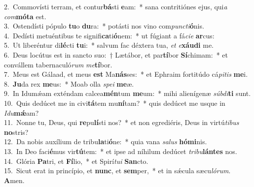 {2.~}Commovísti terram, et contur\textbf{bá}sti \textbf{e}am:~* sana contritiónes ejus, qui\textit{a} \textit{com}\textbf{mó}\textbf{ta} est.\\
{3.~}Ostendísti pópulo \textbf{tu}o \textbf{du}ra:~* potásti nos vino com\textit{pun}\textit{cti}\textbf{ó}nis.\\
{4.~}Dedísti metuéntibus te signifi\textbf{ca}ti\textbf{ó}nem:~* ut fúgiant a fá\textit{ci}\textit{e} \textbf{ar}cus:\\
{5.~}Ut liberéntur di\textbf{lé}cti \textbf{tu}i:~* salvum fac déxtera tua, \textit{et} \textit{e}\textbf{xáu}\textbf{di} me.\\
{6.~}Deus locútus est in sancto suo:~† Lætábor, et par\textbf{tí}bor \textbf{Sí}chimam:~* et convállem tabernaculó\textit{rum} \textit{me}\textbf{tí}bor.\\
{7.~}Meus est Gálaad, et meus \textbf{est} Ma\textbf{nás}ses:~* et Ephraim fortitúdo cá\textit{pi}\textit{tis} \textbf{me}i.\\
{8.~}\textbf{Ju}da rex \textbf{me}us:~* Moab olla \textit{spe}\textit{i} \textbf{me}æ.\\
{9.~}In Idumǽam exténdam calcea\textbf{mén}tum \textbf{me}um:~* mihi alienígenæ \textit{súb}\textit{di}\textbf{ti} sunt.\\
{10.~}Quis dedúcet me in civi\textbf{tá}tem mu\textbf{ní}tam?~* quis dedúcet me usque in \textit{I}\textit{du}\textbf{mǽ}am?\\
{11.~}Nonne tu, Deus, qui \textbf{re}pu\textbf{lí}sti nos?~* et non egrediéris, Deus in virtú\textit{ti}\textit{bus} \textbf{no}stris?\\
{12.~}Da nobis auxílium de tribu\textbf{la}ti\textbf{ó}ne:~* quia vana \textit{sa}\textit{lus} \textbf{hó}\textbf{mi}nis.\\
{13.~}In Deo faci\textbf{é}mus vir\textbf{tú}tem:~* et ipse ad níhilum dedúcet \textit{tri}\textit{bu}\textbf{lán}\textbf{tes} nos.\\
{14.~}Glória \textbf{Pa}tri, et \textbf{Fí}lio,~* et Spirí\textit{tu}\textit{i} \textbf{San}cto.\\
{15.~}Sicut erat in princípio, et \textbf{nunc}, et \textbf{sem}per,~* et in sǽcula sæcu\textit{ló}\textit{rum}. \textbf{A}men.\\
